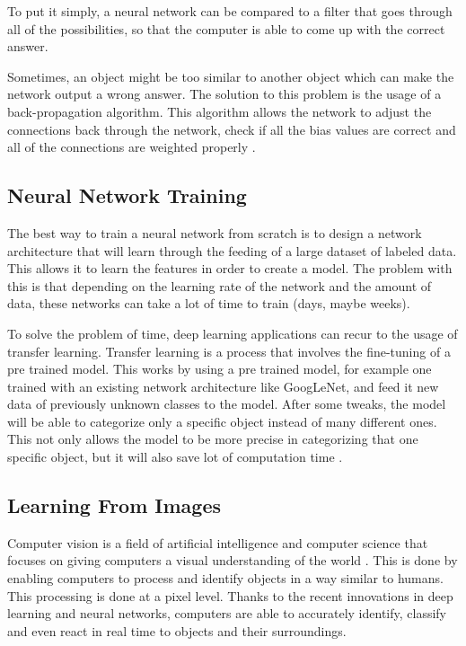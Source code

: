     
   
    \par To put it simply, a neural network can be compared to a filter that goes through all of the possibilities, so that the computer is able to come up with the correct answer.
    \par Sometimes, an object might be too similar to another object which can make the network output a wrong answer. The solution to this problem is the usage of a back-propagation algorithm. This algorithm allows the network to adjust the connections back through the network, check if all the bias values are correct and all of the connections are weighted properly \cite{ArmaanMerchant2018}.
    


    \subsection{Neural Network Training}
    \par The best way to train a neural network from scratch is to design a network architecture that will learn through the feeding of a large dataset of labeled data. This allows it to learn the features in order to create a model. The problem with this is that depending on the learning rate of the network and the amount of data, these networks can take a lot of time to train (days, maybe weeks). 

    \par To solve the problem of time, deep learning applications can recur to the usage of transfer learning. Transfer learning is a process that involves the fine-tuning of a pre trained model. This works by using a pre trained model, for example one trained with an existing network architecture like GoogLeNet, and feed it new data of previously unknown classes to the model. After some tweaks, the model will be able to categorize only a specific object instead of many different ones. This not only allows the model to be more precise in categorizing that one specific object, but it will also save lot of computation time \cite{mathworks_deeplearning}.


     
    \subsection{Learning From Images}
    \par Computer vision is a field of artificial intelligence and computer science that focuses on giving computers a visual understanding of the world \cite{cv} \cite{cv2}. This is done by enabling computers to process and identify objects in a way similar to humans. This processing is done at a pixel level.
    Thanks to the recent innovations in deep learning and neural networks, computers are able to accurately identify, classify and even react in real time to objects and their surroundings. 


